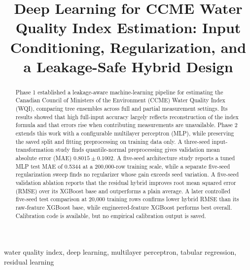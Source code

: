 \documentclass[conference]{IEEEtran}
\begin{document}
\title{Deep Learning for CCME Water Quality Index Estimation: Input Conditioning, Regularization, and a Leakage-Safe Hybrid Design}
\author{
\and{}
\and{}
\and{}
\and{}
}
\maketitle
\begin{abstract}
Phase 1 established a leakage-aware machine-learning pipeline for estimating the Canadian Council of Ministers of the Environment (CCME) Water Quality Index (WQI), comparing tree ensembles across full and partial measurement settings. Its results showed that high full-input accuracy largely reflects reconstruction of the index formula and that errors rise when contributing measurements are unavailable. Phase 2 extends this work with a configurable multilayer perceptron (MLP), while preserving the saved split and fitting preprocessing on training data only. A three-seed input-transformation study finds quantile-normal preprocessing gives validation mean absolute error (MAE) $0.8015\pm0.1002$. A five-seed architecture study reports a tuned MLP test MAE of 0.5344 at a 200,000-row training scale, while a separate five-seed regularization sweep finds no regularizer whose gain exceeds seed variation. A five-seed validation ablation reports that the residual hybrid improves root mean squared error (RMSE) over its XGBoost base and outperforms a plain average. A later controlled five-seed test comparison at 20,000 training rows confirms lower hybrid RMSE than its raw-feature XGBoost base, while engineered-feature XGBoost performs best overall. Calibration code is available, but no empirical calibration output is saved.
\end{abstract}
\begin{IEEEkeywords}water quality index, deep learning, multilayer perceptron, tabular regression, residual learning\end{IEEEkeywords}
\end{document}
